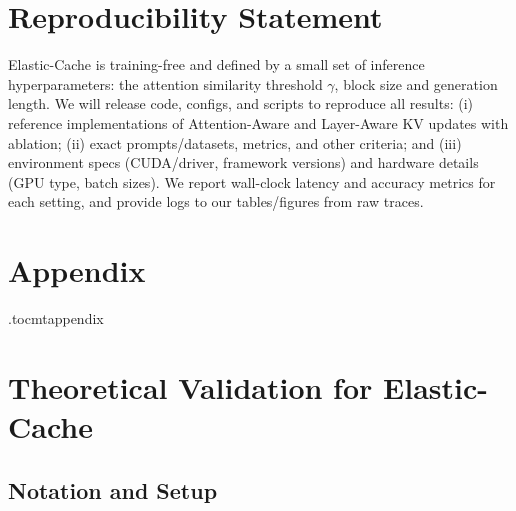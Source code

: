 \documentclass{article} %
\theoremstyle{definition}
\theoremstyle{remark}
\begin{document}
\section*{Reproducibility Statement}
Elastic-Cache is training-free and defined by a small set of inference hyperparameters: the attention similarity threshold $\gamma$, block size and generation length. We will release code, configs, and scripts to reproduce all results: (i) reference implementations of Attention-Aware and Layer-Aware KV updates with ablation; (ii) exact prompts/datasets, metrics, and other criteria; and (iii) environment specs (CUDA/driver, framework versions) and hardware details (GPU type, batch sizes). We report wall-clock latency and accuracy metrics for each setting, and provide logs to our tables/figures from raw traces.



\clearpage
\appendix
\section*{\Large{Appendix}}

\etocdepthtag.toc{mtappendix}
\tableofcontents
\newpage



\section{Theoretical Validation for Elastic-Cache}

\subsection{Notation and Setup}
\end{document}
